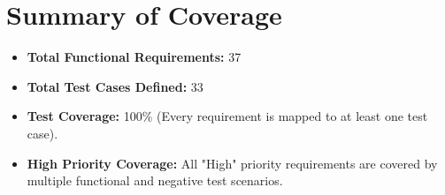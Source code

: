 \documentclass[11pt,a4paper]{article}
\begin{document}
\section{Summary of Coverage}
\begin{itemize}
    \item \textbf{Total Functional Requirements:} 37
    \item \textbf{Total Test Cases Defined:} 33
    \item \textbf{Test Coverage:} 100\% (Every requirement is mapped to at least one test case).
    \item \textbf{High Priority Coverage:} All "High" priority requirements are covered by multiple functional and negative test scenarios.
\end{itemize}
\end{document}
